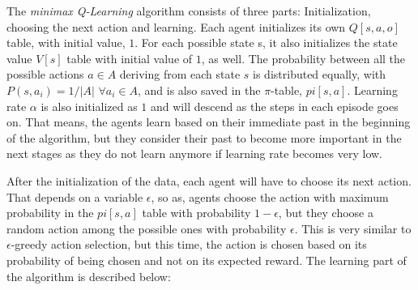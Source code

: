 \documentclass[a4paper,11pt]{article}
\begin{document}
The \textit{minimax Q-Learning} algorithm consists of three parts: 	Initialization, choosing the next action and learning. Each agent initializes its own $Q[s,a,o]$ table, with initial value, $1$. For each possible state s, it also initializes the state value $V[s]$ table with initial value of $1$, as well. The probability between all the possible actions $a \in A$ deriving from each state $s$ is distributed equally, with $P(s,a_{i}) = 1/|A|$ $\forall a_i \in A$, and is also saved in the $\pi$-table, $pi[s,a]$. Learning rate $\alpha$ is also initialized as $1$ and will descend as the steps in each episode goes on. That means, the agents learn based on their immediate past in the beginning of the algorithm, but they consider their past to become more important in the next stages as they do not learn anymore if learning rate becomes very low.

After the initialization of the data, each agent will have to choose its next action. That depends on a variable $\epsilon$, so as, agents choose the action with maximum probability in the $pi[s,a]$ table with probability $1-\epsilon$, but they choose a random action among the possible ones with probability $\epsilon$. This is very similar to $\epsilon$-greedy action selection, but this time, the action is chosen based on its probability of being chosen and not on its expected reward. The learning part of the algorithm is described below:
\end{document}
